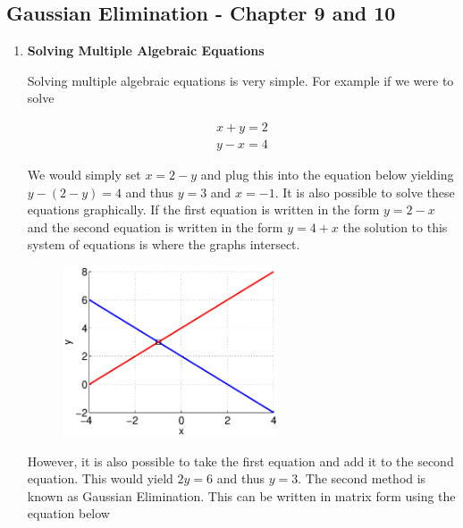 \subsection{Gaussian Elimination - Chapter 9 and 10}

\begin{enumerate}

\item {\bf Solving Multiple Algebraic Equations}

Solving multiple algebraic equations is very simple. For example if we
were to solve 

\begin{equation}
\begin{matrix} x + y = 2 \\
y-x = 4
\end{matrix}
\end{equation}

We would simply set $x=2-y$ and plug this into the equation below
yielding $y-(2-y)=4$ and thus $y=3$ and $x=-1$. It is also possible to
solve these equations graphically. If the first equation is written in
the form $y = 2-x$ and the second equation is written in the form $y =
4+x$ the solution to this system of equations is where the graphs
intersect. 

\begin{figure}[htb]
  \begin{center}
    \includegraphics[height=0.5\textwidth,width=0.6\textwidth]{Graphics/Gaussian_Elimination}
  \end{center}
\end{figure}

However, it is also possible to take the first equation and add it to the second
equation. This would yield $2y=6$ and thus $y=3$. The second method is
known as Gaussian Elimination. This can be written in matrix form
using the equation below


\end{enumerate}
